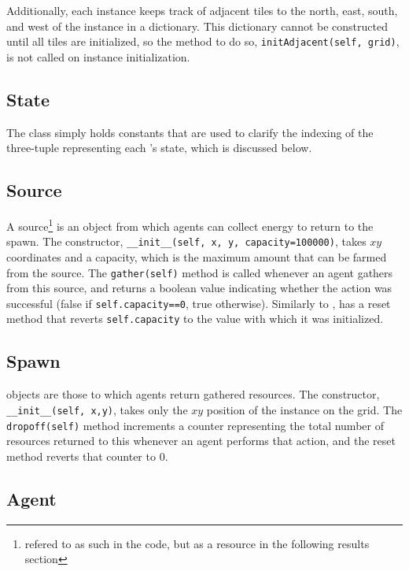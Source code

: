 \documentclass[11pt]{article}
\begin{document}
Additionally, each  instance keeps track of adjacent tiles to the north, east, south, and west of the instance in a dictionary. This dictionary cannot be constructed until all tiles are initialized, so the method to do so, \texttt{initAdjacent(self, grid)}, is not called on instance initialization.

\subsection{State}

The class  simply holds constants that are used to clarify the indexing of the three-tuple representing each 's state, which is discussed below.

\subsection{Source}

A source\footnote{refered to as such in the code, but as a resource in the following results section} is an object from which agents can collect energy to return to the spawn. The constructor, \texttt{__init__(self, x, y, capacity=100000)}, takes $xy$ coordinates and a capacity, which is the maximum amount that can be farmed from the source. The \texttt{gather(self)} method is called whenever an agent gathers from this source, and returns a boolean value indicating whether the action was successful (false if \texttt{self.capacity==0}, true otherwise). Similarly to ,  has a reset method that reverts \texttt{self.capacity} to the value with which it was initialized.

\subsection{Spawn}

 objects are those to which agents return gathered resources. The constructor, \texttt{__init__(self, x,y)}, takes only the $xy$ position of the  instance on the grid. The \texttt{dropoff(self)} method increments a counter representing the total number of resources returned to this  whenever an agent performs that action, and the reset method reverts that counter to 0.

\subsection{Agent}
\end{document}
